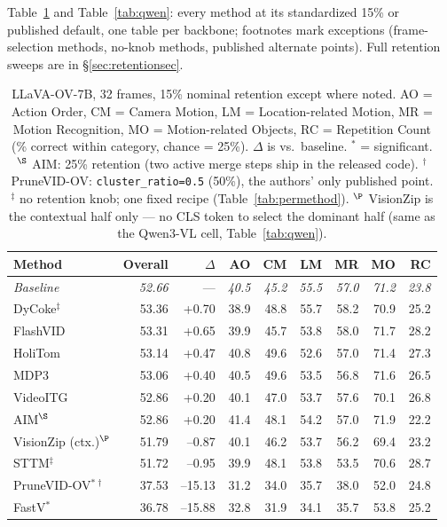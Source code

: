 \documentclass[11pt]{article}
\begin{document}
Table~\ref{tab:llava} and Table~\ref{tab:qwen}: every method at its
standardized 15\% or published default, one table per backbone; footnotes
mark exceptions (frame-selection methods, no-knob methods, published
alternate points). Full retention sweeps are in \S\ref{sec:retentionsec}.

\begin{table}[H]
  \centering
  \small
  \caption{LLaVA-OV-7B, 32 frames, 15\% nominal retention except where
  noted. AO = Action Order, CM = Camera Motion, LM = Location-related
  Motion, MR = Motion Recognition, MO = Motion-related Objects, RC =
  Repetition Count (\% correct within category, chance = 25\%). $\Delta$ is
  vs.\ baseline. $^{*}$ = significant. $^{\S}$ AIM: 25\% retention (two
  active merge steps ship in the released code). $^{\dagger}$ PruneVID-OV:
  \texttt{cluster\_ratio=0.5} (50\%), the authors' only published point.
  $^{\ddagger}$ no retention knob; one fixed recipe (Table~\ref{tab:permethod}).
  $^{\P}$ VisionZip is the contextual half only --- no CLS token to select
  the dominant half (same as the Qwen3-VL cell, Table~\ref{tab:qwen}).}
  \label{tab:llava}
  \begin{tabular}{lrrrrrrrr}
    \toprule
    Method & Overall & $\Delta$ & AO & CM & LM & MR & MO & RC \\
    \midrule
    \textit{Baseline} & \textit{52.66} & --- & \textit{40.5} & \textit{45.2} & \textit{55.5} & \textit{57.0} & \textit{71.2} & \textit{23.8} \\
    DyCoke$^{\ddagger}$ & 53.36 & +0.70 & 38.9 & 48.8 & 55.7 & 58.2 & 70.9 & 25.2 \\
    FlashVID & 53.31 & +0.65 & 39.9 & 45.7 & 53.8 & 58.0 & 71.7 & 28.2 \\
    HoliTom & 53.14 & +0.47 & 40.8 & 49.6 & 52.6 & 57.0 & 71.4 & 27.3 \\
    MDP3 & 53.06 & +0.40 & 40.5 & 49.6 & 53.5 & 56.8 & 71.6 & 26.5 \\
    VideoITG & 52.86 & +0.20 & 40.1 & 47.0 & 53.7 & 57.6 & 70.1 & 26.8 \\
    AIM$^{\S}$ & 52.86 & +0.20 & 41.4 & 48.1 & 54.2 & 57.0 & 71.9 & 22.2 \\
    VisionZip (ctx.)$^{\P}$ & 51.79 & --0.87 & 40.1 & 46.2 & 53.7 & 56.2 & 69.4 & 23.2 \\
    STTM$^{\ddagger}$ & 51.72 & --0.95 & 39.9 & 48.1 & 53.8 & 53.5 & 70.6 & 28.7 \\
    PruneVID-OV$^{*\dagger}$ & 37.53 & --15.13 & 31.2 & 34.0 & 35.7 & 38.0 & 52.0 & 24.8 \\
    FastV$^{*}$ & 36.78 & --15.88 & 32.8 & 31.9 & 34.1 & 35.7 & 53.8 & 25.2 \\
    \bottomrule
  \end{tabular}
\end{table}
\end{document}
